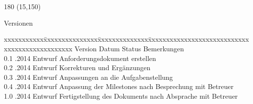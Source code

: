 \chapter*{}
\label{chap:versionnen}

\begin{textblock}{180} (15,150)
\color{black}
\begin{huge}
Versionen
\end{huge}
\vspace{10mm}

\fontsize{10pt}{18pt}\selectfont
\begin{tabbing}
xxxxxxxxxxx\=xxxxxxxxxxxxxxx\=xxxxxxxxxxxxxx\=xxxxxxxxxxxxxxxxxxxxxxxxxxxxxxxxxxxxxxxxxxxxxxx \kill
Version	\> Datum	\> Status		\> Bemerkungen\\
0.1	.2014	\> Entwurf		\> Anforderungsdokument erstellen\\
0.2	.2014	\> Entwurf		\> Korrekturen und Ergänzungen\\
0.3	.2014	\> Entwurf		\> Anpassungen an die Aufgabenstellung\\
0.4	.2014	\> Entwurf		\> Anpassung der Milestones nach Besprechung mit Betreuer\\
1.0	.2014	\> Entwurf		\> Fertigstellung des Dokuments nach Absprache mit Betreuer\\
\end{tabbing}

\end{textblock}
